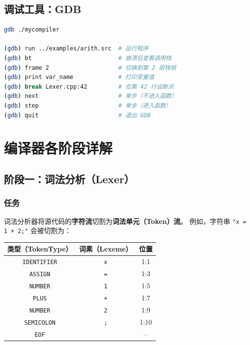 \documentclass[12pt, a4paper]{ctexart}
\begin{document}
\subsection{调试工具：GDB}

\begin{lstlisting}[language=bash, caption={GDB 调试速查（先以 Debug 模式编译）}]
gdb ./mycompiler

(gdb) run ../examples/arith.src  # 运行程序
(gdb) bt                         # 崩溃后查看调用栈
(gdb) frame 2                    # 切换到第 2 层栈帧
(gdb) print var_name             # 打印变量值
(gdb) break Lexer.cpp:42         # 在第 42 行设断点
(gdb) next                       # 单步（不进入函数）
(gdb) step                       # 单步（进入函数）
(gdb) quit                       # 退出 GDB
\end{lstlisting}

\section{编译器各阶段详解}

\subsection{阶段一：词法分析（Lexer）}

\subsubsection{任务}

词法分析器将源代码的\textbf{字符流}切割为\textbf{词法单元（Token）流}。
例如，字符串 \texttt{"x = 1 + 2;"} 会被切割为：

\begin{center}
\renewcommand{\arraystretch}{1.3}
\begin{tabular}{ccc}
\toprule
\textbf{类型（TokenType）} & \textbf{词素（Lexeme）} & \textbf{位置} \\
\midrule
\texttt{IDENTIFIER} & \texttt{x} & 1:1 \\
\texttt{ASSIGN}     & \texttt{=} & 1:3 \\
\texttt{NUMBER}     & \texttt{1} & 1:5 \\
\texttt{PLUS}       & \texttt{+} & 1:7 \\
\texttt{NUMBER}     & \texttt{2} & 1:9 \\
\texttt{SEMICOLON}  & \texttt{;} & 1:10 \\
\texttt{EOF}        &            &  -- \\
\bottomrule
\end{tabular}
\end{center}
\end{document}
